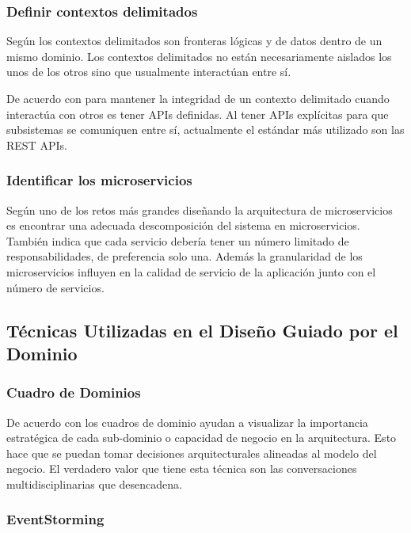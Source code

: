 \subsubsection{Definir contextos delimitados}
Según \cite{bjorner2019domain} los contextos delimitados son fronteras lógicas y de datos dentro de
un mismo dominio.
Los contextos delimitados no están necesariamente aislados los unos de los otros sino que
usualmente interactúan entre sí.

De acuerdo con \cite{evans2004domain} para mantener la integridad de un contexto delimitado cuando
interactúa con otros es tener APIs definidas.
Al tener APIs explícitas para que subsistemas se comuniquen entre sí, actualmente el estándar
más utilizado son las REST APIs.

\subsubsection{Identificar los microservicios}

Según \cite{tyszberowicz2018identifying} uno de los retos más grandes diseñando la arquitectura
de microservicios es encontrar una adecuada descomposición del sistema en microservicios.
También indica que cada servicio debería tener un número limitado de responsabilidades,
de preferencia solo una.
Además la granularidad de los microservicios influyen en la calidad de servicio de la aplicación
junto con el número de servicios.

\subsection{Técnicas Utilizadas en el Diseño Guiado por el Dominio}

\subsubsection{Cuadro de Dominios}

De acuerdo con \cite{richardson2018microservices} los cuadros de dominio ayudan a visualizar
la importancia estratégica de cada sub-dominio o capacidad de negocio en la arquitectura.
Esto hace que se puedan tomar decisiones arquitecturales alineadas al modelo del negocio.
El verdadero valor que tiene esta técnica son las conversaciones multidisciplinarias que desencadena.

\subsubsection{EventStorming}

